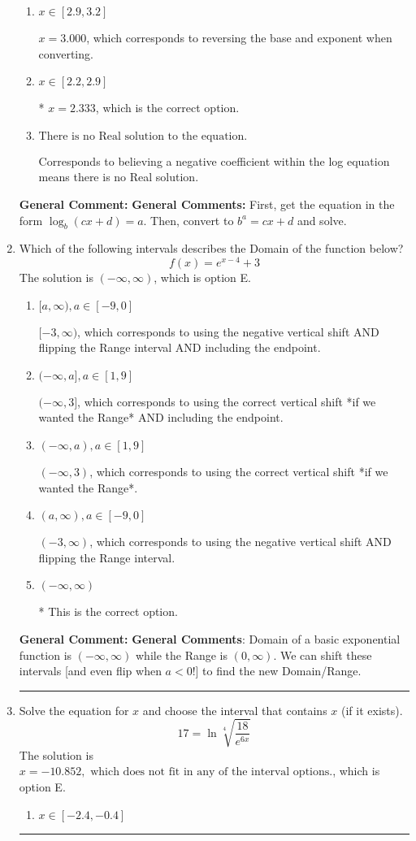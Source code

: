 \documentclass{extbook}[14pt]
\newcommand{\litem}[1]{\item #1

\rule{\textwidth}{0.4pt}}
\begin{document}
\begin{enumerate}
{\begin{enumerate}[label=\Alph*.]
$x = -11.000$, which corresponds to ignoring the vertical shift when converting to exponential form.
\item \( x \in [2.9, 3.2] \)

$x = 3.000$, which corresponds to reversing the base and exponent when converting.
\item \( x \in [2.2, 2.9] \)

* $x = 2.333$, which is the correct option.
\item \( \text{There is no Real solution to the equation.} \)

Corresponds to believing a negative coefficient within the log equation means there is no Real solution.
\end{enumerate}

\textbf{General Comment:} \textbf{General Comments:} First, get the equation in the form $\log_b{(cx+d)} = a$. Then, convert to $b^a = cx+d$ and solve.
}
\litem{
Which of the following intervals describes the Domain of the function below?
\[ f(x) = e^{x-4}+3 \]The solution is \( (-\infty, \infty) \), which is option E.\begin{enumerate}[label=\Alph*.]
\item \( [a, \infty), a \in [-9, 0] \)

$[-3, \infty)$, which corresponds to using the negative vertical shift AND flipping the Range interval AND including the endpoint.
\item \( (-\infty, a], a \in [1, 9] \)

$(-\infty, 3]$, which corresponds to using the correct vertical shift *if we wanted the Range* AND including the endpoint.
\item \( (-\infty, a), a \in [1, 9] \)

$(-\infty, 3)$, which corresponds to using the correct vertical shift *if we wanted the Range*.
\item \( (a, \infty), a \in [-9, 0] \)

$(-3, \infty)$, which corresponds to using the negative vertical shift AND flipping the Range interval.
\item \( (-\infty, \infty) \)

* This is the correct option.
\end{enumerate}

\textbf{General Comment:} \textbf{General Comments}: Domain of a basic exponential function is $(-\infty, \infty)$ while the Range is $(0, \infty)$. We can shift these intervals [and even flip when $a<0$!] to find the new Domain/Range.
}
\litem{
 Solve the equation for $x$ and choose the interval that contains $x$ (if it exists).
\[  17 = \ln{\sqrt[4]{\frac{18}{e^{6x}}}} \]The solution is \( x = -10.852, \text{ which does not fit in any of the interval options.} \), which is option E.\begin{enumerate}[label=\Alph*.]
\item \( x \in [-2.4, -0.4] \)


\end{enumerate}}
\end{enumerate}
\end{document}
